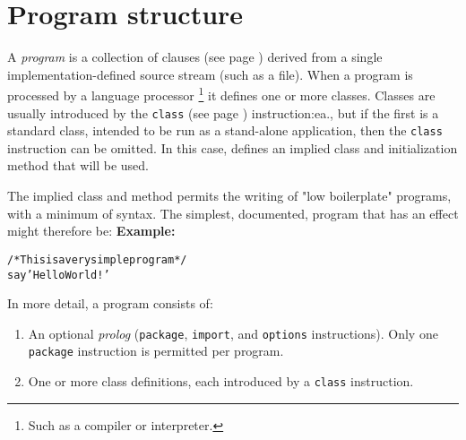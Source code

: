 \chapter{Program structure}\label{refpstruct}
 A \nr{} \emph{program} is a collection of
 clauses (see page \pageref{refclau})  derived from a single implementation-defined
source stream (such as a file).
When a program is processed by a language processor
\footnote{
Such as a compiler or interpreter.
}
it defines one or more classes.
Classes are usually introduced by the  \texttt{class} (see page \pageref{refclass}) 
instruction:ea., but if the first is a standard class, intended to be
run as a stand-alone application, then the \texttt{class} instruction
can be omitted.  In this case, \nr{} defines an implied class
and initialization method that will be used.
 
The implied class and method permits the writing of "low
boilerplate" programs, with a minimum of syntax.
The simplest, documented, \nr{} program that has an effect might
therefore be:
 \textbf{Example:}
\begin{alltt}
/* This is a very simple \nr{} program */
say 'Hello World!'
\end{alltt}
 
In more detail, a \nr{} program consists of:
\begin{enumerate}
\item An optional \emph{prolog} (\texttt{package}, \texttt{import}, and
\texttt{options} instructions).  Only one \texttt{package} instruction
is permitted per program.
\item  One or more class definitions, each introduced by a \texttt{class}
instruction.
\end{enumerate}
 
